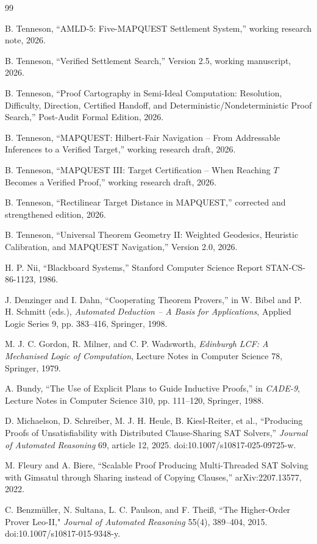 \documentclass[11pt]{article}
\begin{document}
\begin{thebibliography}{99}

B. Tenneson, ``AMLD-5: Five-MAPQUEST Settlement System,'' working research note, 2026.

B. Tenneson, ``Verified Settlement Search,'' Version 2.5, working manuscript, 2026.

B. Tenneson, ``Proof Cartography in Semi-Ideal Computation: Resolution, Difficulty, Direction, Certified Handoff, and Deterministic/Nondeterministic Proof Search,'' Post-Audit Formal Edition, 2026.

B. Tenneson, ``MAPQUEST: Hilbert-Fair Navigation -- From Addressable Inferences to a Verified Target,'' working research draft, 2026.

B. Tenneson, ``MAPQUEST III: Target Certification -- When Reaching $T$ Becomes a Verified Proof,'' working research draft, 2026.

B. Tenneson, ``Rectilinear Target Distance in MAPQUEST,'' corrected and strengthened edition, 2026.

B. Tenneson, ``Universal Theorem Geometry II: Weighted Geodesics, Heuristic Calibration, and MAPQUEST Navigation,'' Version 2.0, 2026.

H. P. Nii, ``Blackboard Systems,'' Stanford Computer Science Report STAN-CS-86-1123, 1986.

J. Denzinger and I. Dahn, ``Cooperating Theorem Provers,'' in W. Bibel and P. H. Schmitt (eds.), \emph{Automated Deduction -- A Basis for Applications}, Applied Logic Series 9, pp. 383--416, Springer, 1998.

M. J. C. Gordon, R. Milner, and C. P. Wadsworth, \emph{Edinburgh LCF: A Mechanised Logic of Computation}, Lecture Notes in Computer Science 78, Springer, 1979.

A. Bundy, ``The Use of Explicit Plans to Guide Inductive Proofs,'' in \emph{CADE-9}, Lecture Notes in Computer Science 310, pp. 111--120, Springer, 1988.

D. Michaelson, D. Schreiber, M. J. H. Heule, B. Kiesl-Reiter, et al., ``Producing Proofs of Unsatisfiability with Distributed Clause-Sharing SAT Solvers,'' \emph{Journal of Automated Reasoning} 69, article 12, 2025. doi:10.1007/s10817-025-09725-w.

M. Fleury and A. Biere, ``Scalable Proof Producing Multi-Threaded SAT Solving with Gimsatul through Sharing instead of Copying Clauses,'' arXiv:2207.13577, 2022.

C. Benzm\"uller, N. Sultana, L. C. Paulson, and F. Thei\ss, ``The Higher-Order Prover Leo-II," \emph{Journal of Automated Reasoning} 55(4), 389--404, 2015. doi:10.1007/s10817-015-9348-y.

\end{thebibliography}
\end{document}
